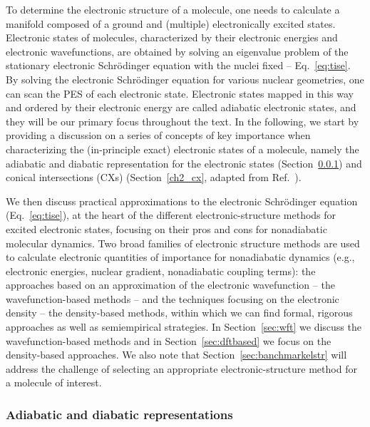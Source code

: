 \documentclass[9pt,bestpractices,pubversion]{livecoms}
\begin{document}
To determine the electronic structure of a molecule, one needs to calculate a manifold composed of a ground and (multiple) electronically excited states. Electronic states of molecules, characterized by their electronic energies and electronic wavefunctions, are obtained by solving an eigenvalue problem of the stationary electronic Schr{\"o}dinger equation with the nuclei fixed -- Eq.~\eqref{eq:tise}. By solving the electronic Schr\"{o}dinger equation for various nuclear geometries, one can scan the PES of each electronic state. Electronic states mapped in this way and ordered by their electronic energy are called adiabatic electronic states, and they will be our primary focus throughout the text. In the following, we start by providing a discussion on a series of concepts of key importance when characterizing the (in-principle exact) electronic states of a molecule, namely the adiabatic and diabatic representation for the electronic states (Section~\ref{sec_adiabatic_diabatic}) and conical intersections (CXs) (Section~\ref{ch2_cx}, adapted from Ref.~). 

We then discuss practical approximations to the electronic Schr{\"o}dinger equation (Eq.~\eqref{eq:tise}), at the heart of the different electronic-structure methods for excited electronic states, focusing on their pros and cons for nonadiabatic molecular dynamics. Two broad families of electronic structure methods are used to calculate electronic quantities of importance for nonadiabatic dynamics (e.g., electronic energies, nuclear gradient, nonadiabatic coupling terms): the approaches based on an approximation of the electronic wavefunction -- the wavefunction-based methods -- and the techniques focusing on the electronic density -- the density-based methods, within which we can find formal, rigorous approaches as well as semiempirical strategies. In Section~\ref{sec:wft} we discuss the wavefunction-based methods and in Section~\ref{sec:dftbased} we focus on the density-based approaches. We also note that Section~\ref{sec:banchmarkelstr} will address the challenge of selecting an appropriate electronic-structure method for a molecule of interest.

\subsubsection{Adiabatic and diabatic representations}
\label{sec_adiabatic_diabatic}
\end{document}
